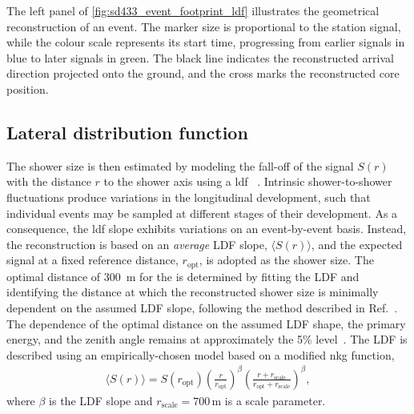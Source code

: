 \documentclass[main.tex]{subfiles}
\begin{document}
The left panel of \cref{fig:sd433_event_footprint_ldf} illustrates the geometrical reconstruction of an  event.
The marker size is proportional to the station signal, while the colour scale represents its start time, progressing from earlier signals in blue to later signals in green.
The black line indicates the reconstructed arrival direction projected onto the ground, and the cross marks the reconstructed core position.

\subsection{Lateral distribution function}
\label{subsec:ldf}

The shower size is then estimated by modeling the fall-off of the signal $S(r)$ with the distance $r$ to the shower axis using a \gls{ldf} ~\cite{Silli:2021:PerformanceSD433}.
Intrinsic shower-to-shower fluctuations produce variations in the longitudinal development, such that individual events may be sampled at different stages of their development.
As a consequence, the \gls{ldf} slope exhibits variations on an event-by-event basis. 
Instead, the reconstruction is based on an \textit{average} LDF slope, $\langle S(r)\rangle$, and the expected signal at a fixed reference distance, $r_\text{opt}$, is adopted as the shower size.
The optimal distance of \qty{300}{m} for the  is determined by fitting the LDF and identifying the distance at which the reconstructed shower size is minimally dependent on the assumed LDF slope, following the method described in Ref.~\cite{Newton:2007:OptimalDistance}.
The dependence of the optimal distance on the assumed LDF shape, the primary energy, and the zenith angle remains at approximately the 5\% level~\cite{PierreAuger:2020:SDReconstruction}.
The LDF is described using an empirically-chosen model based on a modified \gls{nkg} function,
\begin{align}
  \langle S(r)\rangle =
    S(r_\text{opt})
    \left(\frac{r}{r_\text{opt}}\right)^\beta
    \left(\frac{r + r_\text{scale}}{r_\text{opt} + r_\text{scale}}\right)^\beta,
\end{align}
%
\noinder where $\beta$ is the LDF slope and $r_\text{scale}=700\,\text{m}$ is a scale parameter.
\end{document}
